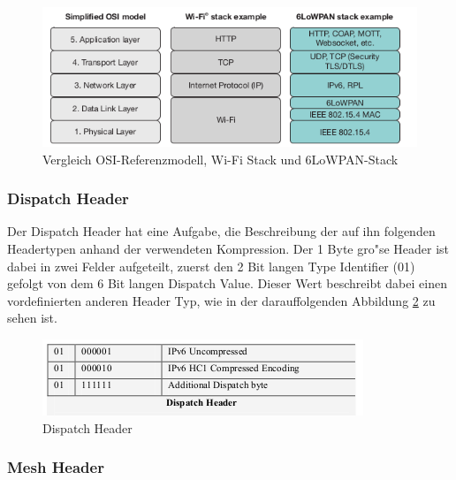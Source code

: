 \documentclass[final]{lktseminar}
\begin{document}
\begin{figure}[h]
    \centering
    \includegraphics{6lowpan_osi_stack.png}
    \caption{Vergleich OSI-Referenzmodell, Wi-Fi Stack und 6LoWPAN-Stack \cite{6lowpan_demystified}}
    \label{fig:Vergleich Stack-Modelle}
\end{figure}


\subsubsection{Dispatch Header}
\label{sec: Dispatch Header}

Der Dispatch Header hat eine Aufgabe, die Beschreibung der auf ihn folgenden Headertypen anhand der verwendeten
Kompression. Der 1 Byte gro"se Header ist dabei in zwei Felder aufgeteilt, zuerst den 2 Bit langen
 Type Identifier (01) gefolgt von dem 6 Bit langen Dispatch Value.
 Dieser Wert beschreibt dabei einen vordefinierten anderen Header Typ, wie in der darauffolgenden Abbildung
\ref{fig:Dispatch Header} zu sehen ist.

\begin{figure}[h]
    \centering
    \includegraphics{dispatch_header.png}
    \caption{Dispatch Header \cite{6lowpan_architecture}}
    \label{fig:Dispatch Header}
\end{figure}


\subsubsection{Mesh Header}
\label{sec: Mesh Header}
\end{document}

